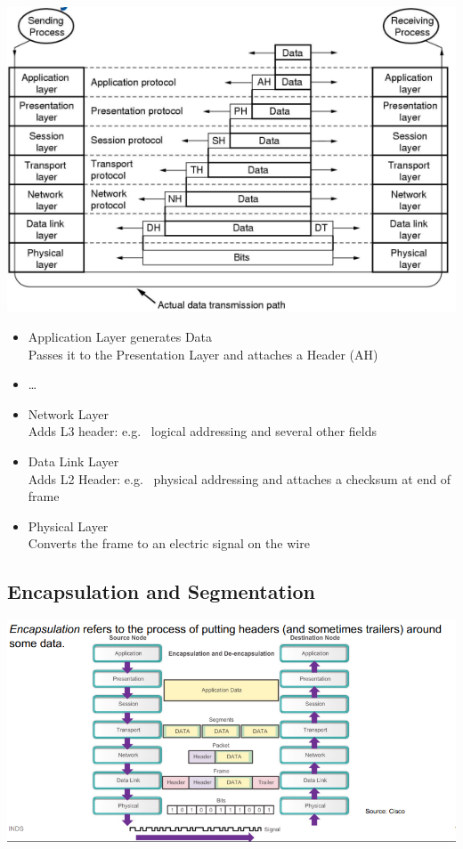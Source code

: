 \documentclass[11pt]{article}
\begin{document}
\includegraphics[width=\textwidth]{data-transmission-trhough-osi-layers}
\begin{itemize}
    \item Application Layer generates Data \\
    Passes it to the Presentation Layer and attaches a Header (AH)
    \item \ldots
    \item Network Layer \\
    Adds L3 header: e.g. \ logical addressing and several other fields
    \item Data Link Layer \\
    Adds L2 Header: e.g. \ physical addressing and attaches a checksum at end of frame
    \item Physical Layer \\
    Converts the frame to an electric signal on the wire
\end{itemize}
\subsection{Encapsulation and Segmentation}
\includegraphics[width=\textwidth]{encapsulation-and-segmentation}
\end{document}
